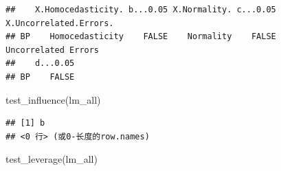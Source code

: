 \documentclass[
]{article}
\newenvironment{Shaded}{\begin{snugshade}}{\end{snugshade}}
\newcommand{\FunctionTok}[1]{\textcolor[rgb]{0.00,0.00,0.00}{#1}}
\newcommand{\NormalTok}[1]{#1}
\begin{document}
\begin{verbatim}
##    X.Homocedasticity. b...0.05 X.Normality. c...0.05 X.Uncorrelated.Errors.
## BP    Homocedasticity    FALSE    Normality    FALSE    Uncorrelated Errors
##    d...0.05
## BP    FALSE
\end{verbatim}

\begin{Shaded}
\begin{Highlighting}[]
\FunctionTok{test\_influence}\NormalTok{(lm\_all)}
\end{Highlighting}
\end{Shaded}

\begin{verbatim}
## [1] b
## <0 行> (或0-长度的row.names)
\end{verbatim}

\begin{Shaded}
\begin{Highlighting}[]
\FunctionTok{test\_leverage}\NormalTok{(lm\_all)}
\end{Highlighting}
\end{Shaded}
\end{document}
